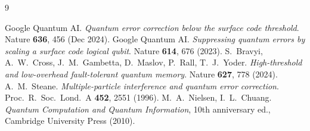 \documentclass[11pt,letterpaper]{article}
\begin{document}
\begin{thebibliography}{9}

 Google Quantum AI. \emph{Quantum error correction below the surface code threshold}. Nature \textbf{636}, 456 (Dec 2024).
 Google Quantum AI. \emph{Suppressing quantum errors by scaling a surface code logical qubit}. Nature \textbf{614}, 676 (2023).
 S.~Bravyi, A.~W.~Cross, J.~M.~Gambetta, D.~Maslov, P.~Rall, T.~J.~Yoder. \emph{High-threshold and low-overhead fault-tolerant quantum memory}. Nature \textbf{627}, 778 (2024).
 A.~M.~Steane. \emph{Multiple-particle interference and quantum error correction}. Proc.\ R.\ Soc.\ Lond.\ A \textbf{452}, 2551 (1996).
 M.~A.~Nielsen, I.~L.~Chuang. \emph{Quantum Computation and Quantum Information}, 10th anniversary ed., Cambridge University Press (2010).

\end{thebibliography}
\end{document}
